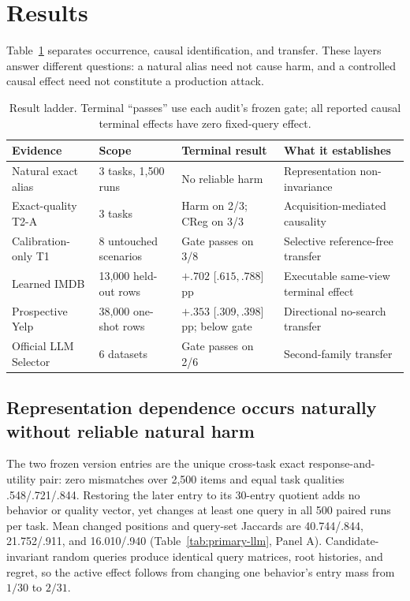 \clearpage
\section{Results}
\label{sec:results}

Table~\ref{tab:result-ladder} separates occurrence, causal identification, and transfer. These layers answer different questions: a natural alias need not cause harm, and a controlled causal effect need not constitute a production attack.

\begin{table}[H]
\centering
\caption{Result ladder. Terminal ``passes'' use each audit's frozen gate; all reported causal terminal effects have zero fixed-query effect.}
\label{tab:result-ladder}
\scriptsize
\setlength{\tabcolsep}{3pt}
\begin{tabularx}{\linewidth}{@{}p{.17\linewidth}p{.21\linewidth}p{.25\linewidth}>{\raggedright\arraybackslash}X@{}}
\toprule
Evidence & Scope & Terminal result & What it establishes \\
\midrule
Natural exact alias & 3 tasks, 1,500 runs & No reliable harm & Representation non-invariance \\
Exact-quality T2-A & 3 tasks & Harm on 2/3; CReg on 3/3 & Acquisition-mediated causality \\
Calibration-only T1 & 8 untouched scenarios & Gate passes on 3/8 & Selective reference-free transfer \\
Learned IMDB & 13,000 held-out rows & $+.702$ [$.615,.788$] pp & Executable same-view terminal effect \\
Prospective Yelp & 38,000 one-shot rows & $+.353$ [$.309,.398$] pp; below gate & Directional no-search transfer \\
Official LLM Selector & 6 datasets & Gate passes on 2/6 & Second-family transfer \\
\bottomrule
\end{tabularx}
\end{table}

\subsection{Representation dependence occurs naturally without reliable natural harm}

The two frozen version entries are the unique cross-task exact response-and-utility pair: zero mismatches over 2,500 items and equal task qualities .548/.721/.844. Restoring the later entry to its 30-entry quotient adds no behavior or quality vector, yet changes at least one query in all 500 paired runs per task. Mean changed positions and query-set Jaccards are 40.744/.844, 21.752/.911, and 16.010/.940 (Table~\ref{tab:primary-llm}, Panel A). Candidate-invariant random queries produce identical query matrices, root histories, and regret, so the active effect follows from changing one behavior's entry mass from $1/30$ to $2/31$.

